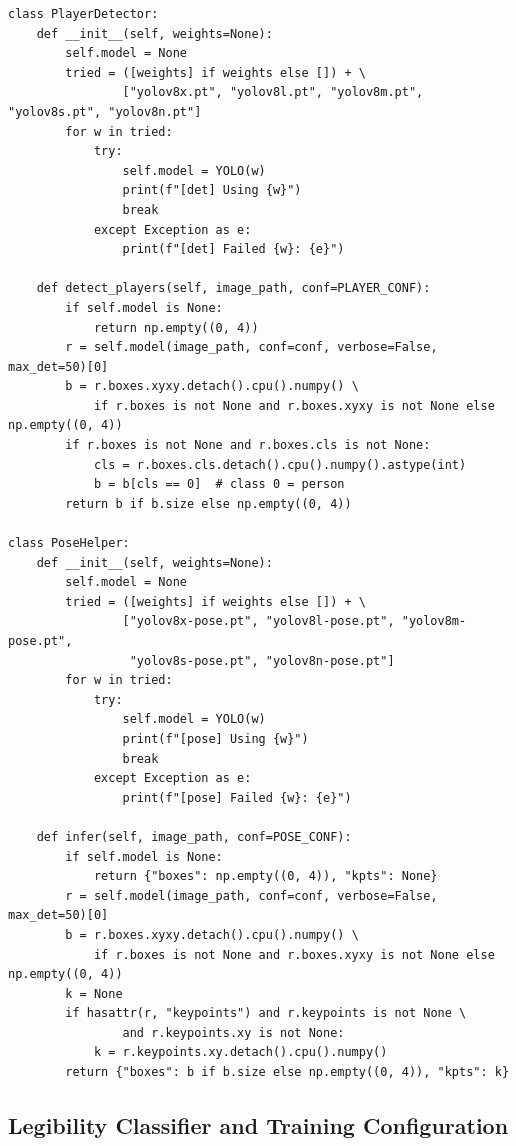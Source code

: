 \begin{lstlisting}[caption={\texttt{PlayerDetector} and \texttt{PoseHelper} --- YOLOv8x person detection and YOLOv8x-Pose keypoint extraction, each with a cascading fallback across model sizes (Section~\ref{sec:models}).}]
class PlayerDetector:
    def __init__(self, weights=None):
        self.model = None
        tried = ([weights] if weights else []) + \
                ["yolov8x.pt", "yolov8l.pt", "yolov8m.pt", "yolov8s.pt", "yolov8n.pt"]
        for w in tried:
            try:
                self.model = YOLO(w)
                print(f"[det] Using {w}")
                break
            except Exception as e:
                print(f"[det] Failed {w}: {e}")

    def detect_players(self, image_path, conf=PLAYER_CONF):
        if self.model is None:
            return np.empty((0, 4))
        r = self.model(image_path, conf=conf, verbose=False, max_det=50)[0]
        b = r.boxes.xyxy.detach().cpu().numpy() \
            if r.boxes is not None and r.boxes.xyxy is not None else np.empty((0, 4))
        if r.boxes is not None and r.boxes.cls is not None:
            cls = r.boxes.cls.detach().cpu().numpy().astype(int)
            b = b[cls == 0]  # class 0 = person
        return b if b.size else np.empty((0, 4))

class PoseHelper:
    def __init__(self, weights=None):
        self.model = None
        tried = ([weights] if weights else []) + \
                ["yolov8x-pose.pt", "yolov8l-pose.pt", "yolov8m-pose.pt",
                 "yolov8s-pose.pt", "yolov8n-pose.pt"]
        for w in tried:
            try:
                self.model = YOLO(w)
                print(f"[pose] Using {w}")
                break
            except Exception as e:
                print(f"[pose] Failed {w}: {e}")

    def infer(self, image_path, conf=POSE_CONF):
        if self.model is None:
            return {"boxes": np.empty((0, 4)), "kpts": None}
        r = self.model(image_path, conf=conf, verbose=False, max_det=50)[0]
        b = r.boxes.xyxy.detach().cpu().numpy() \
            if r.boxes is not None and r.boxes.xyxy is not None else np.empty((0, 4))
        k = None
        if hasattr(r, "keypoints") and r.keypoints is not None \
                and r.keypoints.xy is not None:
            k = r.keypoints.xy.detach().cpu().numpy()
        return {"boxes": b if b.size else np.empty((0, 4)), "kpts": k}
\end{lstlisting}

\subsection{Legibility Classifier and Training Configuration}

